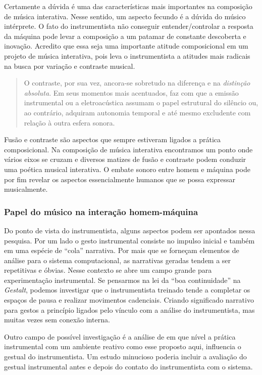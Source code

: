 \documentclass{ppgmus}
\begin{document}
Certamente a dúvida é uma das características mais importantes na composição
de música interativa. Nesse sentido, um aspecto fecundo é a dúvida do músico
intérprete. O fato do instrumentista não conseguir entender/controlar a resposta
da máquina pode levar a composição a um patamar de constante descoberta e inovação.
Acredito que essa seja uma importante atitude composicional em um projeto de 
música interativa, pois leva o instrumentista a atitudes mais radicais na 
busca por variação e contraste musical.

\begin{quote}
O contraste, por sua vez, ancora-se sobretudo na diferença e na 
\textit{distinção absoluta}. Em seus momentos mais acentuados, faz com
que a emissão instrumental ou a eletroacústica assumam o papel estrutural
do silêncio ou, ao contrário, adquiram autonomia temporal e até mesmo
excludente com relação à outra esfera sonora. \cite{menezes2006musica}
\end{quote}

Fusão e contraste são aspectos que sempre estiveram ligados a prática
composicional. Na composição de música interativa encontramos um ponto onde
vários eixos se cruzam e diversos matizes de fusão e contraste podem
conduzir uma poética musical interativa.
O embate sonoro entre homem e máquina pode por fim revelar os aspectos
essencialmente humanos que se possa expressar musicalmente. 


\subsubsection{Papel do músico na interação homem-máquina}


Do ponto de vista do instrumentista, alguns aspectos podem ser apontados nessa pesquisa.
Por um lado o gesto instrumental consiste no impulso inicial e também em uma espécie
de ``cola'' narrativa. Por mais que se forneçam elementos de análise para o sistema
computacional, as narrativas geradas tendem a ser repetitivas e óbvias. Nesse contexto
se abre um campo grande para experimentação instrumental. Se pensarmos na lei da ``boa continuidade''
na \textit{Gestalt}, podemos investigar que o instrumentista treinado tende a completar
os espaços de pausa e realizar movimentos cadenciais. Criando significado narrativo
para gestos a princípio ligados pelo vínculo com a análise do instrumentista, mas muitas
vezes sem conexão interna.

Outro campo de possível investigação é a análise de em que
nível a prática instrumental com um ambiente reativo como
esse proposto aqui, influencia o gestual do instrumentista.
Um estudo minucioso poderia incluir a avaliação do gestual
instrumental antes e depois do contato do instrumentista com 
o sistema.
\end{document}
